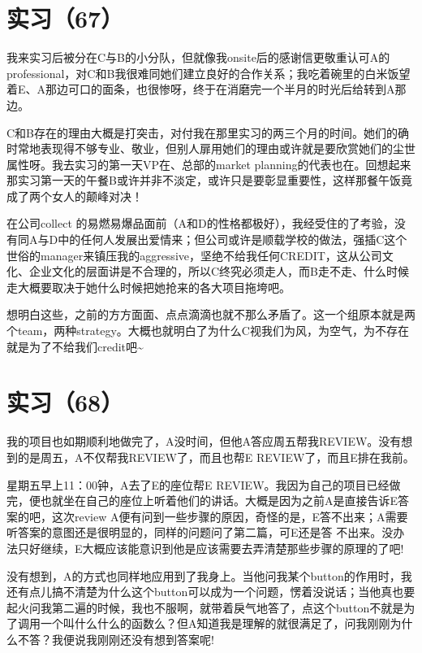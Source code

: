 \documentclass[12pt]{book}
\begin{document}
\section{实习（67）}
\label{sec-5-70}

我来实习后被分在C与B的小分队，但就像我onsite后的感谢信更敬重认可A的professional，对C和B我很难同她们建立良好的合作关系；我吃着碗里的白米饭望着E、A那边可口的面条，也很惨呀，终于在消磨完一个半月的时光后给转到A那边。

C和B存在的理由大概是打突击，对付我在那里实习的两三个月的时间。她们的确时常地表现得不够专业、敬业，但别人扉用她们的理由或许就是要欣赏她们的尘世属性呀。我去实习的第一天VP在、总部的market planning的代表也在。回想起来那实习第一天的午餐B或许并非不淡定，或许只是要彰显重要性，这样那餐午饭竟成了两个女人的颠峰对决！

在公司collect 的易燃易爆品面前（A和D的性格都极好），我经受住的了考验，没有同A与D中的任何人发展出爱情来；但公司或许是顺载学校的做法，强插C这个世俗的manager来镇压我的aggressive，坚绝不给我任何CREDIT，这从公司文化、企业文化的层面讲是不合理的，所以C终究必须走人，而B走不走、什么时候走大概要取决于她什么时候把她抢来的各大项目拖垮吧。

想明白这些，之前的方方面面、点点滴滴也就不那么矛盾了。这一个组原本就是两个team，两种strategy。大概也就明白了为什么C视我们为风，为空气，为不存在就是为了不给我们credit吧\textasciitilde{}~


\section{实习（68）　}
\label{sec-5-71}

我的项目也如期顺利地做完了，A没时间，但他A答应周五帮我REVIEW。没有想到的是周五，A不仅帮我REVIEW了，而且也帮E REVIEW了，而且E排在我前。 

星期五早上11：00钟，A去了E的座位帮E REVIEW。我因为自己的项目已经做完，便也就坐在自己的座位上听着他们的讲话。大概是因为之前A是直接告诉E答案的吧，这次review A便有问到一些步骤的原因，奇怪的是，E答不出来；A需要听答案的意图还是很明显的，同样的问题问了第二篇，可E还是答 不出来。没办法只好继续，E大概应该能意识到他是应该需要去弄清楚那些步骤的原理的了吧!

没有想到，A的方式也同样地应用到了我身上。当他问我某个button的作用时，我还有点儿搞不清楚为什么这个button可以成为一个问题，愣着没说话；当他真也要起火问我第二遍的时候，我也不服啊，就带着戾气地答了，点这个button不就是为了调用一个叫什么什么的函数么？但A知道我是理解的就很满足了，问我刚刚为什么不答？我便说我刚刚还没有想到答案呢!
\end{document}
